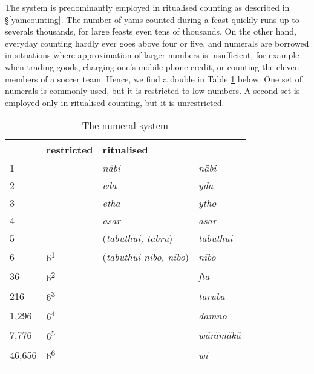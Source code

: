 The  system is predominantly employed in ritualised counting as described in \S{}\ref{yamcounting}. The number of yams counted during a feast quickly runs up to severals thousands, for large feasts even tens of thousands. On the other hand, everyday counting hardly ever goes above four or five, and  numerals are borrowed in situations where approximation of larger numbers is insufficient, for example when trading goods, charging one's mobile phone credit, or counting the eleven members of a soccer team. Hence, we find a double  in Table \ref{numerals-table} below. One set of numerals is commonly used, but it is restricted to low numbers. A second set is employed only in ritualised counting, but it is unrestricted.

\begin{table}
\caption{The numeral system}
\label{numerals-table}
	\begin{tabular}{llll}
		\lsptoprule
		\multicolumn{2}{l}{\textsc{value}}&{restricted}&{ritualised}\\\midrule
		1&&\emph{näbi}&\emph{näbi}\\
		2&&\emph{eda}&\emph{yda}\\
		3&&\emph{etha}&\emph{ytho}\\
		4&&\emph{asar}&\emph{asar}\\
		5&&(\emph{tabuthui, tabru})&\emph{tabuthui}\\
		6&6\textsuperscript{1}&(\emph{tabuthui nibo, nibo})\footnotemark&\emph{nibo}\\
		36&6\textsuperscript{2}&&\emph{fta}\\
		216&6\textsuperscript{3}&&\emph{taruba}\\
		1,296&6\textsuperscript{4}&&\emph{damno}\\
		7,776&6\textsuperscript{5}&&\emph{wärämäkä}\\
		46,656&6\textsuperscript{6}&&\emph{wi}\\
		\lspbottomrule
	\end{tabular}
\end{table}%

